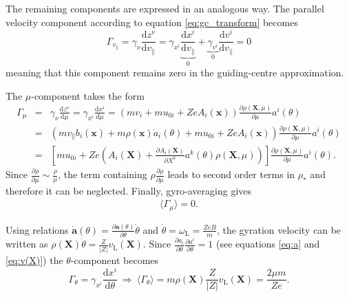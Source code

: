 \documentclass[a4paper,10pt]{article}
\newcommand{\st}[1]{\mathrm{#1}} %
\begin{document}
The remaining components are expressed in an analogous way. The parallel velocity component according to equation \ref{eq:gc_transform} becomes
\begin{equation}
	\Gamma_{v_{\parallel}} = \gamma_{\nu} \frac{\mathrm{d}z^{\nu}}{\mathrm{d}v_{\parallel}} = \gamma_{x^i} \underbrace{\frac{\mathrm{d}x^i}{\mathrm{d}v_{\parallel}}}_{0} + \underbrace{\gamma_{v^i}}_{0} \frac{\mathrm{d}v^i}{\mathrm{d}v_{\parallel}} = 0
	\label{eq:gc_vpar}
\end{equation}
meaning that this component remains zero in the guiding-centre approximation. 

The $\mu$-component takes the form
\begin{eqnarray*}
	\Gamma_{\mu} &=& \gamma_{\nu} \frac{\mathrm{d} z^{\nu}}{\mathrm{d} \mu} = \gamma_{x^i} \frac{\mathrm{d}x^i}{\mathrm{d}\mu} = \left( m v_i + m u_{0i} + Z e A_i(\mathbf{x}) \right) \frac{\partial \rho(\mathbf{X},\mu)}{\partial \mu} a^i(\theta) \\
	&=& \left( m v_{\parallel} b_i(\mathbf{x}) + m \rho(\mathbf{x}) \dot{a}_i(\theta) + m u_{0i} + Z e A_i(\mathbf{x}) \right) \frac{\partial \rho(\mathbf{X},\mu)}{\partial \mu} a^i(\theta) \\
	&=& 
	\left[ m u_{0i} + Z e \left( A_i(\mathbf{X}) + \frac{\partial A_i(\mathbf{X})}{\partial X^k} a^k(\theta) \rho(\mathbf{X}, \mu) \right) \right] \frac{\partial \rho(\mathbf{X},\mu)}{\partial \mu} a^i(\theta).
\end{eqnarray*}
Since $\frac{\partial \rho}{\partial \mu} \sim \frac{\rho}{\mu}$, the term containing $\rho \frac{\partial \rho}{\partial \mu}$ leads to second order terms in $\rho_*$ and therefore it can be neglected. Finally, gyro-averaging gives
\begin{eqnarray}
	\langle \Gamma_{\mu} \rangle = 0.
	\label{eq:gc_mu}
\end{eqnarray}

Using relations $\dot{\mathbf{a}}(\theta) = \frac{\partial \mathbf{a}(\theta)}{\partial \theta} \dot{\theta}$ and $\dot{\theta} = \omega_{\st{L}} = \frac{Z e B}{m}$, the gyration velocity can be written as $\rho(\mathbf{X}) \dot{\theta} = \frac{Z}{|Z|} v_{\st{L}}(\mathbf{X})$. Since $\frac{\partial a_i}{\partial \theta} \frac{\partial a^i}{\partial \theta} = 1$ (see equations \ref{eq:a} and \ref{eq:v(X)}) the $\theta$-component becomes
\begin{equation}
	\Gamma_{\theta} = \gamma_{x^i} \frac{\mathrm{d} x^i}{\mathrm{d} \theta} \ \Longrightarrow\ \langle \Gamma_{\theta} \rangle = m \rho(\mathbf{X}) \frac{Z}{|Z|} v_{\st{L}}(\mathbf{X}) = \frac{2 \mu m}{Z e}.
	\label{eq:gc_theta}
\end{equation}
\end{document}
